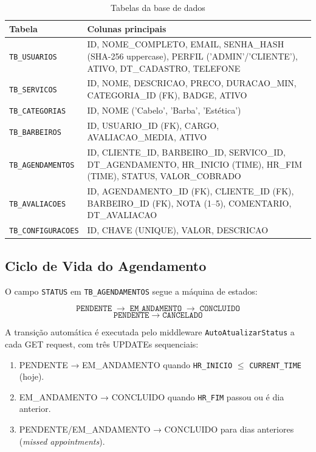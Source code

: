 \documentclass[12pt,a4paper]{article}
\begin{document}
\begin{table}[H]
\centering
\caption{Tabelas da base de dados}
\begin{tabular}{@{}lp{10cm}@{}}
\toprule
\textbf{Tabela} & \textbf{Colunas principais} \\
\midrule
\texttt{TB\_USUARIOS} & ID, NOME\_COMPLETO, EMAIL, SENHA\_HASH (SHA-256 uppercase), PERFIL ('ADMIN'/'CLIENTE'), ATIVO, DT\_CADASTRO, TELEFONE \\
\texttt{TB\_SERVICOS} & ID, NOME, DESCRICAO, PRECO, DURACAO\_MIN, CATEGORIA\_ID (FK), BADGE, ATIVO \\
\texttt{TB\_CATEGORIAS} & ID, NOME ('Cabelo', 'Barba', 'Estética') \\
\texttt{TB\_BARBEIROS} & ID, USUARIO\_ID (FK), CARGO, AVALIACAO\_MEDIA, ATIVO \\
\texttt{TB\_AGENDAMENTOS} & ID, CLIENTE\_ID, BARBEIRO\_ID, SERVICO\_ID, DT\_AGENDAMENTO, HR\_INICIO (TIME), HR\_FIM (TIME), STATUS, VALOR\_COBRADO \\
\texttt{TB\_AVALIACOES} & ID, AGENDAMENTO\_ID (FK), CLIENTE\_ID (FK), BARBEIRO\_ID (FK), NOTA (1--5), COMENTARIO, DT\_AVALIACAO \\
\texttt{TB\_CONFIGURACOES} & ID, CHAVE (UNIQUE), VALOR, DESCRICAO \\
\bottomrule
\end{tabular}
\end{table}

\subsection{Ciclo de Vida do Agendamento}

O campo \texttt{STATUS} em \texttt{TB\_AGENDAMENTOS} segue a máquina de estados:

\[
\texttt{PENDENTE} \;\longrightarrow\; \texttt{EM\_ANDAMENTO} \;\longrightarrow\; \texttt{CONCLUIDO}
\]
\[
\texttt{PENDENTE} \;\longrightarrow\; \texttt{CANCELADO}
\]

A transição automática é executada pelo middleware \texttt{AutoAtualizarStatus} a cada GET request, com três UPDATEs sequenciais:

\begin{enumerate}
  \item PENDENTE → EM\_ANDAMENTO quando \texttt{HR\_INICIO} $\leq$ \texttt{CURRENT\_TIME} (hoje).
  \item EM\_ANDAMENTO → CONCLUIDO quando \texttt{HR\_FIM} passou ou é dia anterior.
  \item PENDENTE/EM\_ANDAMENTO → CONCLUIDO para dias anteriores (\textit{missed appointments}).
\end{enumerate}
\end{document}
